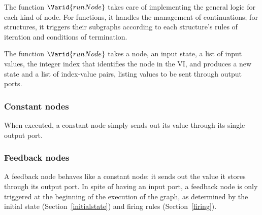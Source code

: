 The function \ensuremath{\Varid{runNode}} takes care of implementing the general logic for each
kind of node. For functions, it handles the management of continuations; for
structures, it triggers their subgraphs according to each structure's rules
of iteration and conditions of termination.

The function \ensuremath{\Varid{runNode}} takes a node, an input state, a list of input values,
the integer index that identifies the node in the VI, and produces a 
new state and a list of index-value pairs, listing values to be sent through
output ports.

\resethooks

\subsubsection{Constant nodes}

When executed, a constant node simply sends out its value through its
single output port.

\resethooks

\subsubsection{Feedback nodes}

A feedback node behaves like a constant node: it sends out the value it stores
through its output port. In spite of having an input port, a feedback node is
only triggered at the beginning of the execution of the graph, as determined
by the initial state (Section~\ref{initialstate}) and firing rules
(Section~\ref{firing}).

